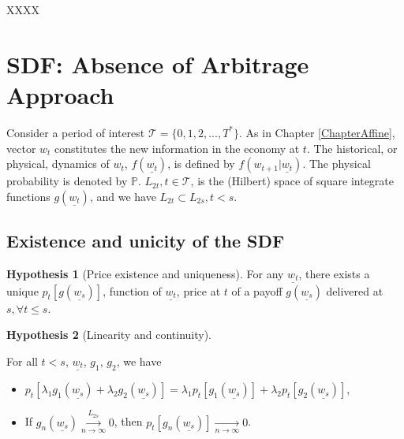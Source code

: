 \documentclass[
  12pt,
]{book}
\providecommand{\tightlist}{%
  \setlength{\itemsep}{0pt}\setlength{\parskip}{0pt}}
\theoremstyle{definition}
\theoremstyle{definition}
\theoremstyle{definition}
\theoremstyle{definition}
\newtheorem{hypothesis}{Hypothesis}[chapter]
\theoremstyle{remark}
\begin{document}
XXXX

\hypertarget{PricingAAO}{%
\section{SDF: Absence of Arbitrage Approach}\label{PricingAAO}}

Consider a period of interest \({\mathcal T} = \{0,1,2,...,T^*\}\). As in Chapter \ref{ChapterAffine}, vector \(w_t\) constitutes the new information in the economy at \(t\). The historical, or physical, dynamics of \(w_t\), \(f(\underline{w_t})\), is defined by \(f(w_{t+1}|\underline{w_t})\). The physical probability is denoted by \(\mathbb{P}\). \(L_{2t}, t \in {\mathcal T}\), is the (Hilbert) space of square integrate functions \(g(\underline{w_t})\), and we have \(L_{2t} \subset L_{2s}, t< s\).

\hypertarget{existence-and-unicity-of-the-sdf}{%
\subsection{Existence and unicity of the SDF}\label{existence-and-unicity-of-the-sdf}}

\begin{hypothesis}[Price existence and uniqueness]
\protect\hypertarget{hyp:Apricing1}{}\label{hyp:Apricing1}For any \(\underline{w_t}\), there exists a unique \(p_t[g(\underline{w_s})]\),
function of \(\underline{w_t}\), price at \(t\) of a payoff
\(g(\underline{w_s})\) delivered at \(s, \forall t \le s\).
\end{hypothesis}

\begin{hypothesis}[Linearity and continuity]
\protect\hypertarget{hyp:Apricing2}{}\label{hyp:Apricing2}

For all \(t < s\), \(\underline{w_t}\), \(g_1\), \(g_2\), we have

\begin{itemize}
\tightlist
\item
  \(p_t[\lambda_1 g_1(\underline{w_s}) + \lambda_2g_2(\underline{w_s})] = \lambda_1p_t[g_1(\underline{w_s})]+\lambda_2 p_t[g_2(\underline{w_s})]\),
\item
  If \(g_n(\underline{w_s}) \overset{L_{2s}}{\underset{n\rightarrow\infty}{\longrightarrow}} 0\), then \(p_t[g_n(\underline{w_s})] \underset{n\rightarrow\infty}{\longrightarrow} 0\).
\end{itemize}

\end{hypothesis}
\end{document}
